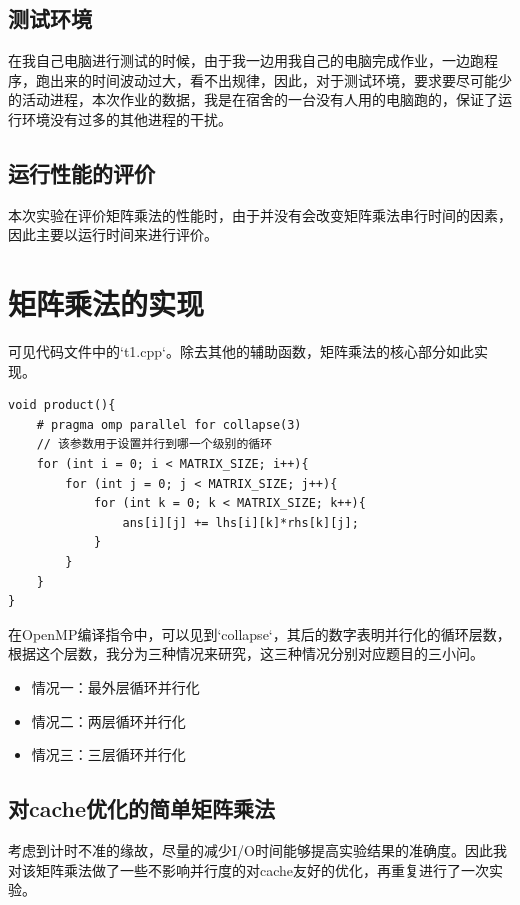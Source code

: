 \documentclass[forprint]{myreport}
\begin{document}
\subsection{测试环境}

在我自己电脑进行测试的时候，由于我一边用我自己的电脑完成作业，一边跑程序，跑出来的时间波动过大，看不出规律，因此，对于测试环境，要求要尽可能少的活动进程，本次作业的数据，我是在宿舍的一台没有人用的电脑跑的，保证了运行环境没有过多的其他进程的干扰。

\subsection{运行性能的评价}

本次实验在评价矩阵乘法的性能时，由于并没有会改变矩阵乘法串行时间的因素，因此主要以运行时间来进行评价。

\section{矩阵乘法的实现}


可见代码文件中的`t1.cpp`。除去其他的辅助函数，矩阵乘法的核心部分如此实现。

\begin{lstlisting}[style = c++]
void product(){
    # pragma omp parallel for collapse(3)
    // 该参数用于设置并行到哪一个级别的循环
    for (int i = 0; i < MATRIX_SIZE; i++){
        for (int j = 0; j < MATRIX_SIZE; j++){
            for (int k = 0; k < MATRIX_SIZE; k++){
                ans[i][j] += lhs[i][k]*rhs[k][j];
            }
        }
    }
}
\end{lstlisting}


在OpenMP编译指令中，可以见到`collapse`，其后的数字表明并行化的循环层数，根据这个层数，我分为三种情况来研究，这三种情况分别对应题目的三小问。

\begin{itemize}
    \item 情况一：最外层循环并行化
    \item 情况二：两层循环并行化
    \item 情况三：三层循环并行化
\end{itemize}

\subsection{对cache优化的简单矩阵乘法}

考虑到计时不准的缘故，尽量的减少I/O时间能够提高实验结果的准确度。因此我对该矩阵乘法做了一些不影响并行度的对cache友好的优化，再重复进行了一次实验。
\end{document}
